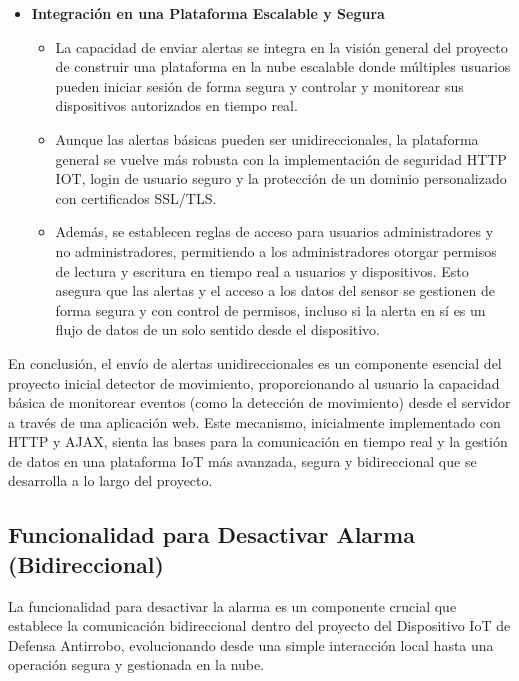 \documentclass{report}
\begin{document}
\begin{itemize}
\begin{itemize}
\begin{itemize}
        \end{itemize}
        \item \textbf{Integración en una Plataforma Escalable y Segura}
        \begin{itemize}
            \item La capacidad de enviar alertas se integra en la visión general del proyecto de construir una plataforma en la nube escalable donde múltiples 
            usuarios pueden iniciar sesión de forma segura y controlar y monitorear sus dispositivos autorizados en tiempo real.
            \item Aunque las alertas básicas pueden ser unidireccionales, la plataforma general se vuelve más robusta con la implementación de seguridad HTTP 
            IOT, login de usuario seguro y la protección de un dominio personalizado con certificados SSL/TLS.
            \item Además, se establecen reglas de acceso para usuarios administradores y no administradores, permitiendo a los administradores otorgar permisos 
            de lectura y escritura en tiempo real a usuarios y dispositivos. Esto asegura que las alertas y el acceso a los datos del sensor se gestionen de 
            forma segura y con control de permisos, incluso si la alerta en sí es un flujo de datos de un solo sentido desde el dispositivo.
        \end{itemize}
    \end{itemize}
\end{itemize}
En conclusión, el envío de alertas unidireccionales es un componente esencial del proyecto inicial detector de movimiento, proporcionando al usuario la 
capacidad básica de monitorear eventos (como la detección de movimiento) desde el servidor a través de una aplicación web. Este mecanismo, inicialmente 
implementado con HTTP y AJAX, sienta las bases para la comunicación en tiempo real y la gestión de datos en una plataforma IoT más avanzada, segura y 
bidireccional que se desarrolla a lo largo del proyecto.

\subsection{Funcionalidad para Desactivar Alarma (Bidireccional)}
La funcionalidad para desactivar la alarma es un componente crucial que establece la comunicación bidireccional dentro del proyecto del Dispositivo IoT 
de Defensa Antirrobo, evolucionando desde una simple interacción local hasta una operación segura y gestionada en la nube.
\end{document}
